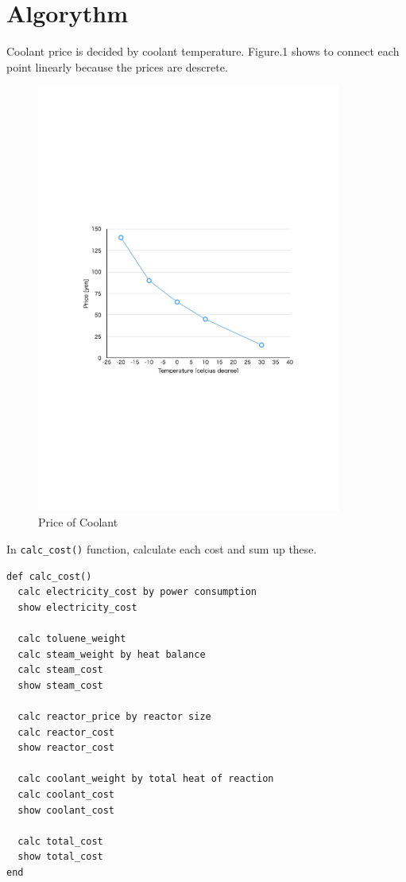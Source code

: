 \documentclass[a4paper,titlepage]{article}
\begin{document}
  \newpage

  \section{Algorythm}
  Coolant price is decided by coolant temperature. Figure.1 shows to connect each point linearly because the prices are descrete.

  \begin{figure}[htbp]
    \centering
    \includegraphics[width=10cm]{images/coolant.pdf}
    \caption{Price of Coolant}
  \end{figure}

  In \verb/calc_cost()/ function, calculate each cost and sum up these.

  \begin{screen}
  \begin{verbatim}
def calc_cost()
  calc electricity_cost by power consumption
  show electricity_cost

  calc toluene_weight
  calc steam_weight by heat balance
  calc steam_cost
  show steam_cost

  calc reactor_price by reactor size
  calc reactor_cost
  show reactor_cost

  calc coolant_weight by total heat of reaction
  calc coolant_cost
  show coolant_cost

  calc total_cost
  show total_cost
end\end{verbatim}
  \end{screen}
\end{document}
